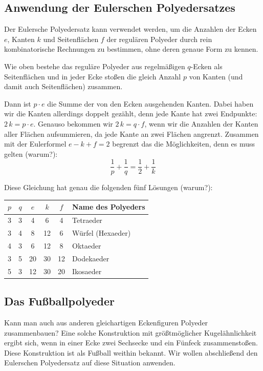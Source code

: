 \documentclass[11pt]{article}
\begin{document}
\subsection*{Anwendung der Eulerschen Polyedersatzes}

Der Eulersche Polyedersatz kann verwendet werden, um die Anzahlen der Ecken
$e$, Kanten $k$ und Seitenflächen $f$ der regulären Polyeder durch rein
kombinatorische Rechnungen zu bestimmen, ohne deren genaue Form zu kennen.

Wie oben bestehe das reguläre Polyeder aus regelmäßigen $q$-Ecken als
Seitenflächen und in jeder Ecke stoßen die gleich Anzahl $p$ von Kanten (und
damit auch Seitenflächen) zusammen.

Dann ist $p\cdot e$ die Summe der von den Ecken ausgehenden Kanten. Dabei
haben wir die Kanten allerdings doppelt gezählt, denn jede Kante hat zwei
Endpunkte: $2\,k = p\cdot e$. Genauso bekommen wir $2\,k = q\cdot f$, wenn wir
die Anzahlen der Kanten aller Flächen aufsummieren, da jede Kante an zwei
Flächen angrenzt. Zusammen mit der Eulerformel $e-k+f=2$ begrenzt das die
Möglichkeiten, denn es muss gelten (warum?):
\[\frac{1}{p} + \frac{1}{q} =  \frac12 +\frac{1}{k}\]

Diese Gleichung hat genau die folgenden fünf Lösungen (warum?):
\begin{center}
  \begin{tabular}{|cc|ccc|l|}\hline
    $p$ & $q$ & $e$ & $k$ & $f$ & Name des Polyeders \\\hline
    3 & 3 &  4 &  6 &  4 & Tetraeder\\
    3 & 4 &  8 & 12 &  6 & Würfel (Hexaeder)\\
    4 & 3 &  6 & 12 &  8 & Oktaeder\\
    3 & 5 & 20 & 30 & 12 & Dodekaeder\\
    5 & 3 & 12 & 30 & 20 & Ikosaeder\\\hline
  \end{tabular}
\end{center}

\subsection*{Das Fußballpolyeder}

Kann man auch aus anderen gleichartigen Eckenfiguren Polyeder zusammenbauen?
Eine solche Konstruktion mit größtmöglicher Kugelähnlichkeit ergibt sich, wenn
in einer Ecke zwei Sechsecke und ein Fünfeck zusammenstoßen.  Diese
Konstruktion ist als Fußball weithin bekannt. Wir wollen abschließend den
Eulerschen Polyedersatz auf diese Situation anwenden.
\end{document}
